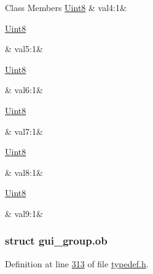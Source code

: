\begin{DoxyFields}{Class Members}
\hypertarget{a00001_aa8516b0468eb31028c3dd669867c15b1}{\hyperlink{a00001_a979e3e23b9a449e69ab6a8a83b6042f8}{Uint8}}\label{a00001_aa8516b0468eb31028c3dd669867c15b1}
&
val4\+:1&
\\
\hline

\hypertarget{a00001_a294a6e0d759cdbcf55753c4a58161721}{\hyperlink{a00001_a979e3e23b9a449e69ab6a8a83b6042f8}{Uint8}}\label{a00001_a294a6e0d759cdbcf55753c4a58161721}
&
val5\+:1&
\\
\hline

\hypertarget{a00001_a1b18b7cd2d63787cbe1d97e57a54853c}{\hyperlink{a00001_a979e3e23b9a449e69ab6a8a83b6042f8}{Uint8}}\label{a00001_a1b18b7cd2d63787cbe1d97e57a54853c}
&
val6\+:1&
\\
\hline

\hypertarget{a00001_a7e526a670883f267ce15deff74740a6e}{\hyperlink{a00001_a979e3e23b9a449e69ab6a8a83b6042f8}{Uint8}}\label{a00001_a7e526a670883f267ce15deff74740a6e}
&
val7\+:1&
\\
\hline

\hypertarget{a00001_aeafd00c5d025e9d71e9ed588f7f97e4b}{\hyperlink{a00001_a979e3e23b9a449e69ab6a8a83b6042f8}{Uint8}}\label{a00001_aeafd00c5d025e9d71e9ed588f7f97e4b}
&
val8\+:1&
\\
\hline

\hypertarget{a00001_aa2da4af9e1d8f4d37887f719cda60bda}{\hyperlink{a00001_a979e3e23b9a449e69ab6a8a83b6042f8}{Uint8}}\label{a00001_aa2da4af9e1d8f4d37887f719cda60bda}
&
val9\+:1&
\\
\hline

\end{DoxyFields}
\label{d1/d51/a00079}
\hypertarget{a00001_d1/d51/a00079}{}
\subsubsection{struct gui\+\_\+group.\+ob}


Definition at line \hyperlink{a00001_source_l00313}{313} of file \hyperlink{a00001_source}{typedef.\+h}.



